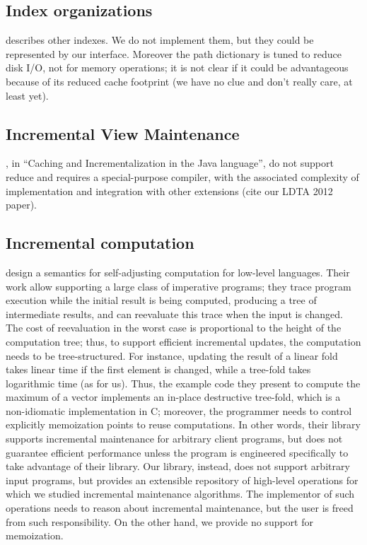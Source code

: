 \documentclass{article}
\begin{document}
\subsection{Index organizations}

\citet{Lee98} describes other indexes. We do not implement them, but
they could be represented by our interface. Moreover the path dictionary
is tuned to reduce disk I/O, not for memory operations; it is not clear
if it could be advantageous because of its reduced cache footprint (we
have no clue and don't really care, at least yet).

\subsection{Incremental View Maintenance}

\citet{Willis08}, in ``Caching and Incrementalization in the Java
language'', do not support reduce and requires a special-purpose
compiler, with the associated complexity of implementation and
integration with other extensions (cite our LDTA 2012 paper).

\subsection{Incremental computation}

\citet{Hammer11} design a semantics for self-adjusting computation for
low-level languages. Their work allow supporting a large class of
imperative programs; they trace program execution while the initial
result is being computed, producing a tree of intermediate results, and
can reevaluate this trace when the input is changed. The cost of
reevaluation in the worst case is proportional to the height of the
computation tree; thus, to support efficient incremental updates, the
computation needs to be tree-structured. For instance, updating the
result of a linear fold takes linear time if the first element is
changed, while a tree-fold takes logarithmic time (as for us). Thus, the
example code they present to compute the maximum of a vector implements
an in-place destructive tree-fold, which is a non-idiomatic
implementation in C; moreover, the programmer needs to control
explicitly memoization points to reuse computations. In other words,
their library supports incremental maintenance for arbitrary client
programs, but does not guarantee efficient performance unless the
program is engineered specifically to take advantage of their library.
Our library, instead, does not support arbitrary input programs, but
provides an extensible repository of high-level operations for which we
studied incremental maintenance algorithms. The implementor of such
operations needs to reason about incremental maintenance, but the user
is freed from such responsibility. On the other hand, we provide no
support for memoization.
\end{document}
